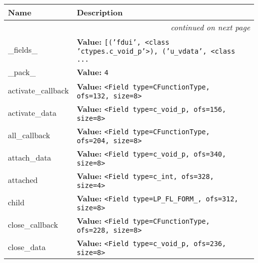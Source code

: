     \vspace{-1cm}
\hspace{\varindent}\begin{longtable}{|p{\varnamewidth}|p{\vardescrwidth}|l}
\cline{1-2}
\cline{1-2} \centering \textbf{Name} & \centering \textbf{Description}& \\
\cline{1-2}
\endhead\cline{1-2}\multicolumn{3}{r}{\small\textit{continued on next page}}\\\endfoot\cline{1-2}
\endlastfoot\raggedright \_\-f\-i\-e\-l\-d\-s\-\_\- & \raggedright \textbf{Value:} 
{\tt \texttt{[}\texttt{(}\texttt{'}\texttt{fdui}\texttt{'}\texttt{, }{\textless}class 'ctypes.c\_void\_p'{\textgreater}\texttt{)}\texttt{, }\texttt{(}\texttt{'}\texttt{u\_vdata}\texttt{'}\texttt{, }{\textless}class \texttt{...}}&\\
\cline{1-2}
\raggedright \_\-p\-a\-c\-k\-\_\- & \raggedright \textbf{Value:} 
{\tt 4}&\\
\cline{1-2}
\raggedright a\-c\-t\-i\-v\-a\-t\-e\-\_\-c\-a\-l\-l\-b\-a\-c\-k\- & \raggedright \textbf{Value:} 
{\tt {\textless}Field type=CFunctionType, ofs=132, size=8{\textgreater}}&\\
\cline{1-2}
\raggedright a\-c\-t\-i\-v\-a\-t\-e\-\_\-d\-a\-t\-a\- & \raggedright \textbf{Value:} 
{\tt {\textless}Field type=c\_void\_p, ofs=156, size=8{\textgreater}}&\\
\cline{1-2}
\raggedright a\-l\-l\-\_\-c\-a\-l\-l\-b\-a\-c\-k\- & \raggedright \textbf{Value:} 
{\tt {\textless}Field type=CFunctionType, ofs=204, size=8{\textgreater}}&\\
\cline{1-2}
\raggedright a\-t\-t\-a\-c\-h\-\_\-d\-a\-t\-a\- & \raggedright \textbf{Value:} 
{\tt {\textless}Field type=c\_void\_p, ofs=340, size=8{\textgreater}}&\\
\cline{1-2}
\raggedright a\-t\-t\-a\-c\-h\-e\-d\- & \raggedright \textbf{Value:} 
{\tt {\textless}Field type=c\_int, ofs=328, size=4{\textgreater}}&\\
\cline{1-2}
\raggedright c\-h\-i\-l\-d\- & \raggedright \textbf{Value:} 
{\tt {\textless}Field type=LP\_FL\_FORM\_, ofs=312, size=8{\textgreater}}&\\
\cline{1-2}
\raggedright c\-l\-o\-s\-e\-\_\-c\-a\-l\-l\-b\-a\-c\-k\- & \raggedright \textbf{Value:} 
{\tt {\textless}Field type=CFunctionType, ofs=228, size=8{\textgreater}}&\\
\cline{1-2}
\raggedright c\-l\-o\-s\-e\-\_\-d\-a\-t\-a\- & \raggedright \textbf{Value:} 
{\tt {\textless}Field type=c\_void\_p, ofs=236, size=8{\textgreater}}&\\

\end{longtable}

